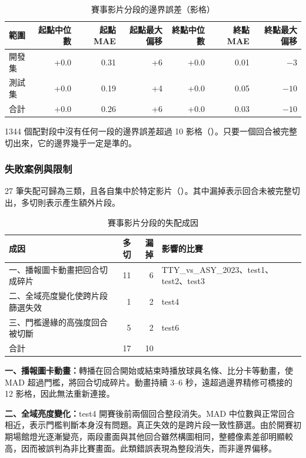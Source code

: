 \begin{table}[htbp]
  \centering
  \small
  \caption{賽事影片分段的邊界誤差（影格）}
  \label{tab:seg-boundary}
  \begin{tabular}{|l|r|r|r|r|r|r|}
    \hline
    範圍 & 起點中位數 & 起點 MAE & 起點最大偏移 & 終點中位數 & 終點 MAE & 終點最大偏移 \\ \hline
    開發集 & +0.0 & 0.31 & +6 & +0.0 & 0.01 & $-3$ \\ \hline
    測試集 & +0.0 & 0.19 & +4 & +0.0 & 0.05 & $-10$ \\ \hline
    合計 & +0.0 & 0.26 & +6 & +0.0 & 0.03 & $-10$ \\ \hline
  \end{tabular}
\end{table}

1344 個配對段中沒有任何一段的邊界誤差超過 10 影格（）。只要一個回合被完整切出來，它的邊界幾乎一定是準的。

\subsubsection{失敗案例與限制}

27 筆失配可歸為三類，且各自集中於特定影片（）。其中漏掉表示回合未被完整切出，多切則表示產生額外片段。

\begin{table}[htbp]
  \centering
  \small
  \caption{賽事影片分段的失配成因}
  \label{tab:seg-failures}
  \begin{tabularx}{\linewidth}{|L|r|r|>{\raggedright\arraybackslash}p{13em}|}
    \hline
    成因 & 多切 & 漏掉 & 影響的比賽 \\ \hline
    一、播報圖卡動畫把回合切成碎片 & 11 & 6 & TTY\_vs\_ASY\_2023、test1、test2、test3 \\ \hline
    二、全域亮度變化使跨片段篩選失效 & 1 & 2 & test4 \\ \hline
    三、門檻邊緣的高強度回合被切斷 & 5 & 2 & test6 \\ \hline
    合計 & 17 & 10 & \\ \hline
  \end{tabularx}
\end{table}

\textbf{一、播報圖卡動畫：}轉播在回合開始或結束時播放球員名條、比分卡等動畫，使 MAD 超過門檻，將回合切成碎片。動畫持續 3--6 秒，遠超過邊界精修可橋接的 12 影格，因此無法重新連接。

\textbf{二、全域亮度變化：}test4 開賽後前兩個回合整段消失。MAD 中位數與正常回合相近，表示門檻判斷本身沒有問題。真正失效的是跨片段一致性篩選。由於開賽初期場館燈光逐漸變亮，兩段畫面與其他回合雖然構圖相同，整體像素差卻明顯較高，因而被誤判為非比賽畫面。此類錯誤表現為整段消失，而非邊界偏移。

